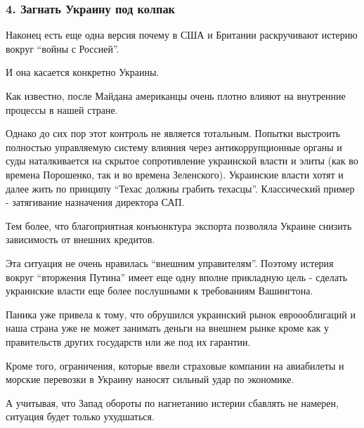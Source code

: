  
 
 
 
 

\subsubsection{4. Загнать Украину под колпак}
\label{sec:16_02_2022.stz.news.ua.strana.3.putin_ne_napal_infvojna.4.zagnat_ukrainu_pod_kolpak}

Наконец есть еще одна версия почему в США и Британии раскручивают истерию
вокруг \enquote{войны с Россией}.

И она касается конкретно Украины.

Как известно, после Майдана американцы очень плотно влияют на внутренние
процессы в нашей стране.

Однако до сих пор этот контроль не является тотальным. Попытки выстроить
полностью управляемую систему влияния через антикоррупционные органы и суды
наталкивается на скрытое сопротивление украинской власти и элиты (как во
времена Порошенко, так и во времена Зеленского). Украинские власти хотят и
далее жить по принципу \enquote{Техас должны грабить техасцы}. Классический пример -
затягивание назначения директора САП.

Тем более, что благоприятная конъюнктура экспорта позволяла Украине снизить
зависимость от внешних кредитов. 

Эта ситуация не очень нравилась \enquote{внешним управителям}. Поэтому истерия вокруг
\enquote{вторжения Путина} имеет еще одну вполне прикладную цель - сделать украинские
власти еще более послушными к требованиям Вашингтона. 

Паника уже привела к тому, что обрушился украинский рынок евроооблигаций и наша
страна уже не может занимать деньги на внешнем рынке кроме как у правительств
других государств или же под их гарантии. 

Кроме того, ограничения, которые ввели страховые компании на авиабилеты и
морские перевозки в Украину наносят сильный удар по экономике. 

А учитывая, что Запад обороты по нагнетанию истерии сбавлять не намерен,
ситуация будет только ухудшаться.


